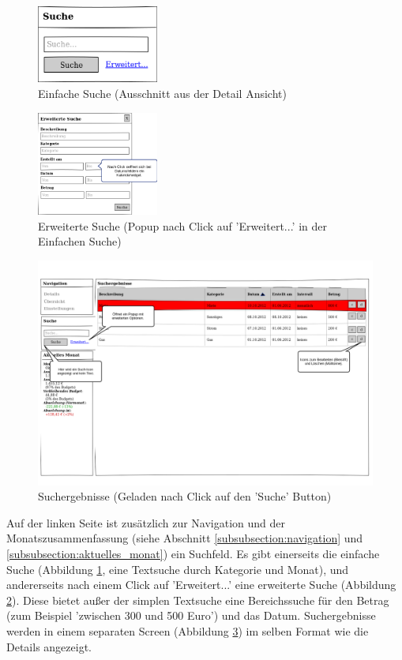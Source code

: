 \begin{figure}[htl]
\centering
\includegraphics[width=4cm]{img/web_simple_search}
\caption{Einfache Suche (Ausschnitt aus der Detail Ansicht)}
\label{fig:web_simple_search}
\end{figure}

\begin{figure}[htl]
\centering
\includegraphics[width=4cm]{img/web_advanced_search}
\caption{Erweiterte Suche (Popup nach Click auf 'Erweitert...' in der Einfachen Suche)}
\label{fig:web_advanced_search}
\end{figure}

\begin{figure}[htl]
\centering
\includegraphics[width=\textwidth]{img/web_search}
\caption{Suchergebnisse (Geladen nach Click auf den 'Suche' Button)}
\label{fig:web_search}
\end{figure}

Auf der linken Seite ist zusätzlich zur Navigation und der Monatszusammenfassung (siehe Abschnitt \ref{subsubsection:navigation} und \ref{subsubsection:aktuelles_monat}) ein Suchfeld. Es gibt einerseits die einfache Suche (Abbildung \ref{fig:web_simple_search}, eine Textsuche durch Kategorie und Monat), und andererseits nach einem Click auf
'Erweitert...' eine erweiterte Suche (Abbildung \ref{fig:web_advanced_search}). Diese bietet außer der simplen Textsuche eine Bereichssuche für den Betrag (zum Beispiel 'zwischen 300 und 500 Euro') und das Datum. Suchergebnisse werden in einem separaten Screen (Abbildung \ref{fig:web_search}) im selben Format wie die Details angezeigt.

